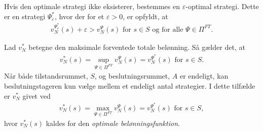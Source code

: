 
Hvis den optimale strategi ikke eksisterer, bestemmes en $\varepsilon$-optimal strategi. Dette er en strategi $\Psi^*_\varepsilon$, hvor der for et $\varepsilon>0$, er opfyldt, at 
\begin{align*}
    v_N^{\Psi^*_\varepsilon}(s)+\varepsilon>v_N^\Psi(s) \text{ for } s\in S \text{ og for alle } \Psi \in \Pi^{FT}.
\end{align*}

Lad $v_N^*$ betegne den maksimale forventede totale belønning. Så gælder det, at
%
\begin{align}\label{eq:v_N=sup}
    v_N^*(s)=\sup_{\Psi\in \Pi^{FT}} v_N^{\Psi}(s)=v_N^{\Psi^*}(s) \text{ for }  s\in S.
\end{align}
Når både tilstandsrummet, $S$, og beslutningsrummet, $A$ er endeligt, kan beslutningstageren kun vælge mellem et endeligt antal strategier. I dette tilfælde er $v_N^*$ givet ved
\begin{align*}
    v_N^*(s)=\max_{\Psi\in \Pi^{FT}} v_N^{\Psi}(s)=v_N^{\Psi^*}(s) \text{ for }  s\in S,
\end{align*}
hvor $v_N^*(s)$ kaldes for den \textit{optimale belønningsfunktion}.








